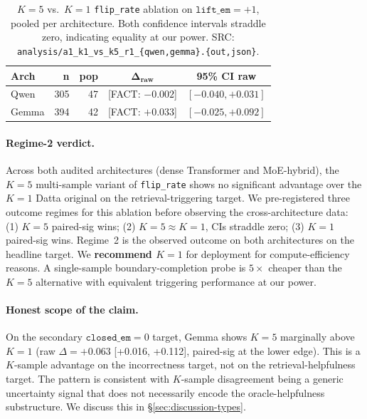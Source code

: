 \documentclass[11pt]{article}
\newcommand{\FACT}[1]{{\color{blue}\textsf{[FACT: #1]}}}
\begin{document}
\begin{table}[h]
\centering\small
\begin{tabular}{@{}lrrcc@{}}
\toprule
\textbf{Arch} & \textbf{n} & \textbf{pop} &
$\boldsymbol{\Delta_{\text{raw}}}$ & \textbf{95\% CI raw} \\
\midrule
Qwen & 305 & 47 & \FACT{$-0.002$} & $[-0.040, +0.031]$ \\
Gemma & 394 & 42 & \FACT{$+0.033$} & $[-0.025, +0.092]$ \\
\bottomrule
\end{tabular}
\caption{$K{=}5$ vs.\ $K{=}1$ \texttt{flip\_rate} ablation on
$\texttt{lift\_em}{=}+1$, pooled per architecture. Both confidence
intervals straddle zero, indicating equality at our power.
SRC: \texttt{analysis/a1\_k1\_vs\_k5\_r1\_\{qwen,gemma\}.\{out,json\}}.}
\label{tab:k-ablation}
\end{table}

\paragraph{Regime-2 verdict.} Across both audited architectures (dense
Transformer and MoE-hybrid), the $K{=}5$ multi-sample variant of
\texttt{flip\_rate} shows no significant advantage over the $K{=}1$ Datta
original on the retrieval-triggering target. We pre-registered three outcome
regimes for this ablation before observing the cross-architecture data:
(1) $K{=}5$ paired-sig wins; (2) $K{=}5 \approx K{=}1$, CIs straddle zero;
(3) $K{=}1$ paired-sig wins. Regime~2 is the observed outcome on both
architectures on the headline target. We \textbf{recommend $K{=}1$} for
deployment for compute-efficiency reasons. A single-sample boundary-completion
probe is $5\times$ cheaper than the $K{=}5$ alternative with equivalent
triggering performance at our power.

\paragraph{Honest scope of the claim.} On the secondary
$\texttt{closed\_em}{=}0$ target, Gemma shows $K{=}5$ marginally above
$K{=}1$ (raw $\Delta = +0.063$ [+0.016, +0.112], paired-sig at the lower
edge). This is a $K$-sample advantage on the incorrectness target, not on
the retrieval-helpfulness target. The pattern is consistent with $K$-sample
disagreement being a generic uncertainty signal that does not necessarily
encode the oracle-helpfulness substructure. We discuss this in
\S\ref{sec:discussion-types}.
\end{document}
